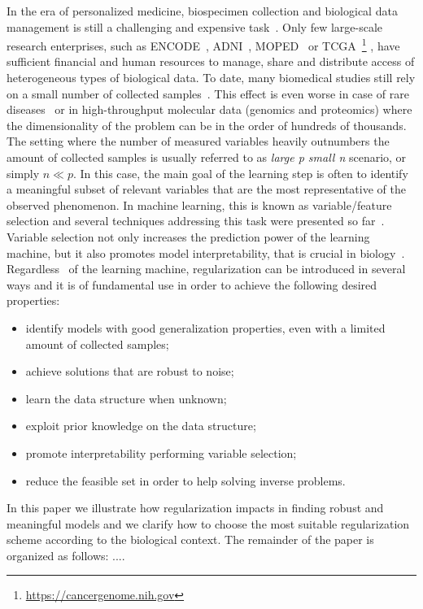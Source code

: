 In the era of personalized medicine, biospecimen collection and biological data management is still a challenging and expensive task~\cite{toga2015sharing}. Only few large-scale research enterprises, such as ENCODE~\cite{encode2004encode},  ADNI~\cite{jack2008alzheimer},  MOPED~\cite{kolker2012moped} or TCGA~\footnote{\url{https://cancergenome.nih.gov}}
, have sufficient financial and human resources to manage, share and distribute access of heterogeneous types of biological data. To date, many biomedical studies still rely on a small number of collected samples~\cite{mcneish2016effect, button2013power, yu2013shrinkage}. This effect is even worse in case of rare diseases~\cite{Garg2016ABM} or in high-throughput molecular data (\eg genomics and proteomics) where the dimensionality of the problem can be in the order of hundreds of thousands.
%
The setting where the number of measured variables heavily outnumbers the amount of collected samples is usually referred to as \textit{large p small n} scenario, or simply $n \ll p$. In this case, the main goal of the learning step is often to identify a meaningful subset of relevant variables that are the most representative of the observed phenomenon. In machine learning, this is known as variable/feature selection and several techniques addressing this task were presented so far~\cite{guyon2002gene}. Variable selection not only increases the prediction power of the learning machine, but it also promotes model interpretability, that is crucial in biology~\cite{altmann2010permutation}.
%
Regardless~\citep{okser2014regularized} of the learning machine, regularization can be introduced in several ways and it is of fundamental use in order to achieve the following desired properties:
%
\begin{itemize}
	\item identify models with good generalization properties, even with a limited amount of collected samples;
	\item achieve solutions that are robust to noise;
	\item learn the data structure when unknown;
	\item exploit prior knowledge on the data structure;
	\item promote interpretability performing variable selection;
	\item reduce the feasible set in order to help solving inverse problems. %
\end{itemize}
%
%
In this paper we illustrate how regularization impacts in finding robust and meaningful models and we clarify how to choose the most suitable regularization scheme according to the biological context. The remainder of the paper is organized as follows: ....


